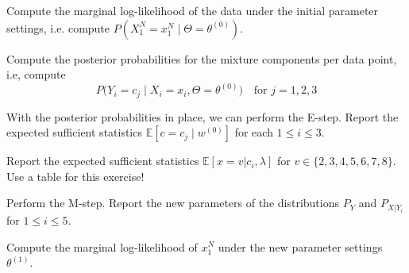 \documentclass[a4paper,10pt,landscape,twocolumn]{scrartcl}
\begin{document}
\begin{exercise}
	
	
	\begin{subex}
		Compute the marginal log-likelihood of the data under the initial parameter settings, i.e. compute $P(X_1^N = x_1^N \mid \Theta = \theta^{(0)})$.
	\end{subex}
	
	\begin{subex}
		Compute the posterior probabilities for the mixture components per data point, i.e, compute
		\[
			P\bigl(Y_i = c_j \mid X_i = x_i, \Theta = \theta^{(0)}\bigr) \quad \text{for $j=1,2,3$}
		\]
	\end{subex}
	
	\begin{subex}
		With the posterior probabilities in place, we can perform the E-step.
	Report the expected sufficient statistics $\mathbb{E}[c=c_j \mid w^{(0)}] $ for each $ 1 \leq i \leq 3$. 	
	\end{subex}

	\begin{subex}
	Report the expected sufficient statistics $ \mathbb{E}[x=v|c_{i},\lambda] $ for $ v \in \{2,3,4,5,6,7,8\} $. Use a table for this exercise!
	\end{subex}
	
	\begin{subex}
	Perform the M-step. Report the new parameters of the distributions $ P_{Y} $ and $ P_{X|Y_{i}} $ for  $ 1 \leq i \leq 5 $.	
	\end{subex}
	
	\begin{subex}
		Compute the marginal log-likelihood of $ x_1^N $ under the new parameter settings $\theta^{(1)}$. 
	\end{subex}


\end{exercise}
\end{document}
